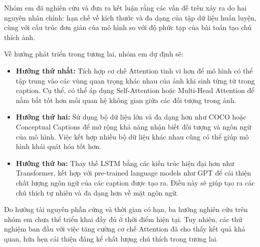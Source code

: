 \documentclass[../main.tex]{subfiles}
\begin{document}
Nhóm em đã nghiên cứu và đưa ra kết luận rằng các vấn đề trên xảy ra do hai nguyên nhân chính: hạn chế về kích thước và đa dạng của tập dữ liệu huấn luyện, cùng với cấu trúc đơn giản của mô hình so với độ phức tạp của bài toán tạo chú thích ảnh.

Về hướng phát triển trong tương lai, nhóm em dự định sẽ:
\begin{itemize}
    \item \textbf{Hướng thứ nhất: } Tích hợp cơ chế Attention tinh vi hơn để mô hình có thể tập trung vào các vùng quan trọng khác nhau của ảnh khi sinh từng từ trong caption. Cụ thể, có thể áp dụng Self-Attention hoặc Multi-Head Attention để nắm bắt tốt hơn mối quan hệ không gian giữa các đối tượng trong ảnh.
    \item \textbf{Hướng thứ hai: } Sử dụng bộ dữ liệu lớn và đa dạng hơn như COCO hoặc Conceptual Captions để mở rộng khả năng nhận biết đối tượng và ngôn ngữ của mô hình. Việc kết hợp nhiều bộ dữ liệu khác nhau cũng có thể giúp mô hình khái quát hóa tốt hơn.
    \item \textbf{Hướng thứ ba: } Thay thế LSTM bằng các kiến trúc hiện đại hơn như Transformer, kết hợp với pre-trained language models như GPT để cải thiện chất lượng ngôn ngữ của các caption được tạo ra. Điều này sẽ giúp tạo ra các chú thích tự nhiên và đa dạng hơn về mặt ngôn ngữ.
\end{itemize}

Do hướng tài nguyên phần cứng và thời gian có hạn, ba hướng nghiên cứu trên nhóm em chưa thể triển khai đầy đủ ở thời điểm hiện tại. Tuy nhiên, các thử nghiệm ban đầu với việc tăng cường cơ chế Attention đã cho thấy kết quả khả quan, hứa hẹn cải thiện đáng kể chất lượng chú thích trong tương lai.
\end{document}

